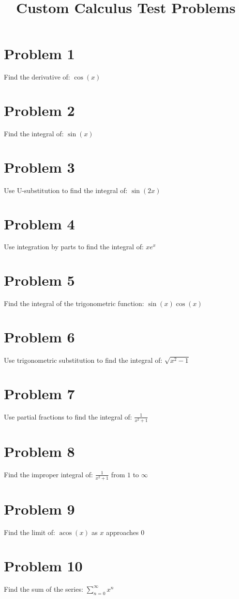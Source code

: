 \documentclass{article}
\begin{document}
\title{Custom Calculus Test Problems}
\author{}
\date{}
\maketitle
\section*{Problem 1}
Find the derivative of: $\cos{\left(x \right)}$

\vfill
\vfill
\section*{Problem 2}
Find the integral of: $\sin{\left(x \right)}$

\vfill
\newpage
\section*{Problem 3}
Use U-substitution to find the integral of: $\sin{\left(2 x \right)}$

\vfill
\vfill
\section*{Problem 4}
Use integration by parts to find the integral of: $x e^{x}$

\vfill
\newpage
\section*{Problem 5}
Find the integral of the trigonometric function: $\sin{\left(x \right)} \cos{\left(x \right)}$

\vfill
\vfill
\section*{Problem 6}
Use trigonometric substitution to find the integral of: $\sqrt{x^{2} - 1}$

\vfill
\newpage
\section*{Problem 7}
Use partial fractions to find the integral of: $\frac{1}{x^{2} + 1}$

\vfill
\vfill
\section*{Problem 8}
Find the improper integral of: $\frac{1}{x^{2} + 1}$ from $1$ to $\infty$

\vfill
\newpage
\section*{Problem 9}
Find the limit of: $\operatorname{acos}{\left(x \right)}$ as $x$ approaches $0$

\vfill
\vfill
\section*{Problem 10}
Find the sum of the series: $\sum_{n=0}^{\infty} x^{n}$

\vfill
\newpage
\end{document}
